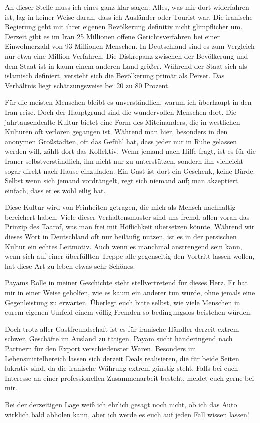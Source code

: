 An dieser Stelle muss ich eines ganz klar sagen: Alles, was mir dort widerfahren ist, lag in keiner Weise daran, dass ich Ausländer oder Tourist war. Die iranische Regierung geht mit ihrer eigenen Bevölkerung definitiv nicht glimpflicher um. Derzeit gibt es im Iran 25 Millionen offene Gerichtsverfahren bei einer Einwohnerzahl von 93 Millionen Menschen. In Deutschland sind es zum Vergleich nur etwa eine Million Verfahren. Die Diskrepanz zwischen der Bevölkerung und dem Staat ist in kaum einem anderen Land größer. Während der Staat sich als islamisch definiert, versteht sich die Bevölkerung primär als Perser. Das Verhältnis liegt schätzungsweise bei 20 zu 80 Prozent.

Für die meisten Menschen bleibt es unverständlich, warum ich überhaupt in den Iran reise. Doch der Hauptgrund sind die wundervollen Menschen dort. Die jahrtausendealte Kultur bietet eine Form des Miteinanders, die in westlichen Kulturen oft verloren gegangen ist. Während man hier, besonders in den anonymen Großstädten, oft das Gefühl hat, dass jeder nur in Ruhe gelassen werden will, zählt dort das Kollektiv. Wenn jemand nach Hilfe fragt, ist es für die Iraner selbstverständlich, ihn nicht nur zu unterstützen, sondern ihn vielleicht sogar direkt nach Hause einzuladen. Ein Gast ist dort ein Geschenk, keine Bürde. Selbst wenn sich jemand vordrängelt, regt sich niemand auf; man akzeptiert einfach, dass er es wohl eilig hat.

Diese Kultur wird von Feinheiten getragen, die mich als Mensch nachhaltig bereichert haben. Viele dieser Verhaltensmuster sind uns fremd, allen voran das Prinzip des Taarof, was man frei mit Höflichkeit übersetzen könnte. Während wir dieses Wort in Deutschland oft nur beiläufig nutzen, ist es in der persischen Kultur ein echtes Leitmotiv. Auch wenn es manchmal anstrengend sein kann, wenn sich auf einer überfüllten Treppe alle gegenseitig den Vortritt lassen wollen, hat diese Art zu leben etwas sehr Schönes.

Payams Rolle in meiner Geschichte steht stellvertretend für dieses Herz. Er hat mir in einer Weise geholfen, wie es kaum ein anderer tun würde, ohne jemals eine Gegenleistung zu erwarten. Überlegt euch bitte selbst, wie viele Menschen in eurem eigenen Umfeld einem völlig Fremden so bedingungslos beistehen würden.

Doch trotz aller Gastfreundschaft ist es für iranische Händler derzeit extrem schwer, Geschäfte im Ausland zu tätigen. Payam sucht händeringend nach Partnern für den Export verschiedenster Waren. Besonders im Lebensmittelbereich lassen sich derzeit Deals realisieren, die für beide Seiten lukrativ sind, da die iranische Währung extrem günstig steht. Falls bei euch Interesse an einer professionellen Zusammenarbeit besteht, meldet euch gerne bei mir.

Bei der derzeitigen Lage weiß ich ehrlich gesagt noch nicht, ob ich das Auto wirklich bald abholen kann, aber ich werde es euch auf jeden Fall wissen lassen!
